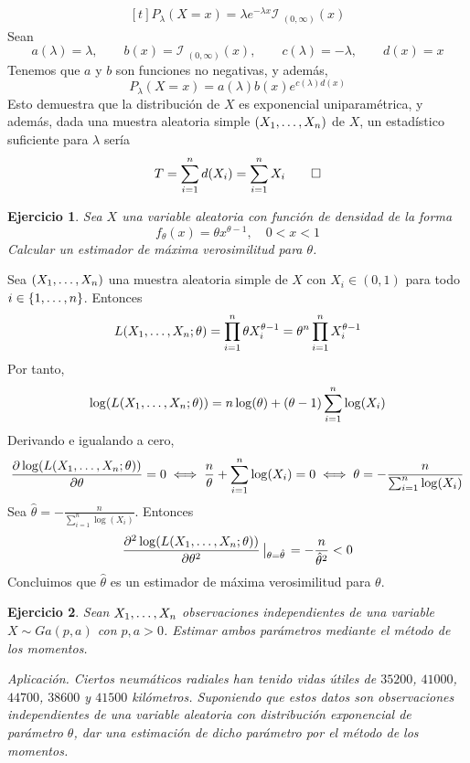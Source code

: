 \documentclass[11pt]{report}
\makeatletter
\renewenvironment{proof}[1][\proofname]{\par
  \pushQED{\qed}%
  \normalfont \topsep\z@skip %
  \trivlist
  \item[\hskip\labelsep
        \itshape
    #1\@addpunct{.}]\ignorespaces
}{%
  \popQED\endtrivlist\@endpefalse
}
\newtheorem{ejercicio}{Ejercicio}
\makeatother
\begin{document}
\begin{proof}
\begin{enumerate}
    \[\begin{aligned}[t]
      P_\lambda(X=x) = \lambda e^{-\lambda x}\mathcal{I}_{\,\, (0,\infty)}(x)
    \end{aligned}\]
    Sean
    \[a(\lambda) = \lambda, \qquad b(x) = \mathcal{I}_{\, \, (0,\infty) }(x), \qquad c(\lambda) = -\lambda, \qquad d(x) = x\]
    Tenemos que $a$ y $b$ son funciones no negativas, y además,
    \[P_\lambda(X=x) = a(\lambda)b(x)e^{c(\lambda)d(x)}\]
    Esto demuestra que la distribución de $X$ es exponencial uniparamétrica, y además, dada una muestra aleatoria simple $(X_1,\mathellipsis,X_n)$ de $X$, un estadístico suficiente para $\lambda$ sería
    \[T=\sum_{i=1}^n d(X_i) = \sum_{i=1}^n X_i \qedhere\]
  \end{enumerate}
\end{proof}

\begin{ejercicio}
  Sea $X$ una variable aleatoria con función de densidad de la forma
  \[f_\theta(x) = \theta x^{\theta-1}, \quad 0<x<1\]
  Calcular un estimador de máxima verosimilitud para $\theta$. 
\end{ejercicio}

\begin{proof}
Sea $(X_1,\mathellipsis,X_n)$ una muestra aleatoria simple de $X$ con $X_i \in (0,1)$ para todo $i \in \{1,\mathellipsis,n\}$. Entonces
\[L(X_1,\mathellipsis,X_n;\theta) = \prod_{i=1}^n \theta X_i^{\theta-1} =\theta^n \prod_{i=1}^n X_i^{\theta-1} \]
Por tanto,
\[\log(L(X_1,\mathellipsis,X_n;\theta)) = n\log(\theta)+(\theta-1)\sum_{i=1}^n \log(X_i)\]
Derivando e igualando a cero,
\[\frac{\partial \log(L(X_1,\mathellipsis,X_n;\theta)) }{\partial \theta} = 0 \iff \frac{n}{\theta}+\sum_{i=1}^n \log(X_i) = 0 \iff \theta = -\frac{n}{\sum_{i=1}^n \log(X_i)}\]
Sea $\hat{\theta} = -\frac{n}{\sum_{i=1}^n \log(X_i)}$. Entonces
\[\frac{\partial^2 \log(L(X_1,\mathellipsis,X_n;\theta)) }{\partial \theta^2} \left|_{\theta = \hat{\theta}}\right. = -\frac{n}{\hat{\theta}^2} < 0\]
Concluimos que $\hat{\theta}$ es un estimador de máxima verosimilitud para $\theta$.
\end{proof}

\begin{ejercicio}
  Sean $X_1,\mathellipsis,X_n$ observaciones independientes de una variable $X \sim Ga(p,a)$ con $p,a>0$. Estimar ambos parámetros mediante el método de los momentos.

  \emph{Aplicación}. Ciertos neumáticos radiales han tenido vidas útiles de $35200$, $41000$, $44700$, $38600$ y $41500$ kilómetros. Suponiendo que estos datos son observaciones independientes de una variable aleatoria con distribución exponencial de parámetro $\theta$, dar una estimación de dicho parámetro por el método de los momentos.
\end{ejercicio}
\end{document}
